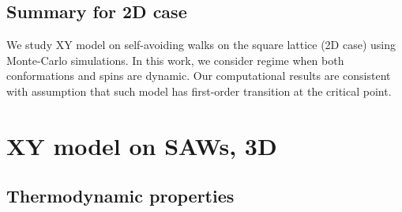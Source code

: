 \subsection{Summary for 2D case}
We study XY model on self-avoiding walks on the square lattice (2D case) using Monte-Carlo simulations. In this work, we consider regime when both conformations and spins are dynamic. Our computational results are consistent with assumption that such model has first-order transition at the critical point. 





\section{XY model on SAWs, 3D}


\subsection{Thermodynamic properties}



